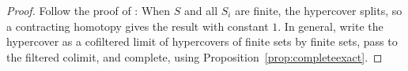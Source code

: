 \begin{proof}
Follow the proof of \cite[Theorem 3.3]{Condensed}: When $S$ and all $S_i$ are finite, the hypercover splits, so a contracting homotopy gives the result with constant $1$. In general, write the hypercover as a cofiltered limit of hypercovers of finite sets by finite sets, pass to the filtered colimit, and complete, using Proposition~\ref{prop:completeexact}.
\end{proof}


